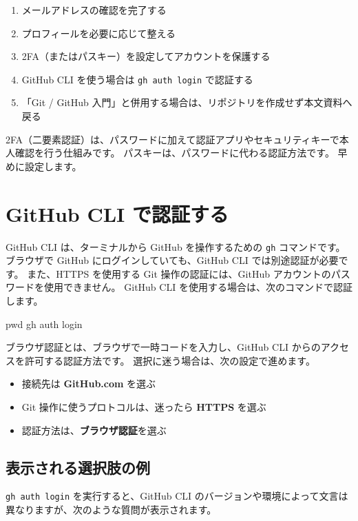 \documentclass[a4paper]{jlreq}
\newcommand{\cmd}[1]{\texttt{#1}}
\newcommand{\term}[1]{\textbf{#1}}
\begin{document}
\begin{enumerate}
  \item メールアドレスの確認を完了する
  \item プロフィールを必要に応じて整える
  \item 2FA（またはパスキー）を設定してアカウントを保護する
  \item GitHub CLI を使う場合は \cmd{gh auth login} で認証する
  \item 「Git / GitHub 入門」と併用する場合は、リポジトリを作成せず本文資料へ戻る
\end{enumerate}

2FA（二要素認証）は、パスワードに加えて認証アプリやセキュリティキーで本人確認を行う仕組みです\cite{github-account}。
パスキーは、パスワードに代わる認証方法です\cite{github-passkeys}。
早めに設定します。

\section{GitHub CLI で認証する}

GitHub CLI は、ターミナルから GitHub を操作するための \cmd{gh} コマンドです。
ブラウザで GitHub にログインしていても、GitHub CLI では別途認証が必要です。
また、HTTPS を使用する Git 操作の認証には、GitHub アカウントのパスワードを使用できません\cite{github-authentication}。
GitHub CLI を使用する場合は、次のコマンドで認証します\cite{gh-auth-login}。

\begin{codeblock}
pwd
gh auth login
\end{codeblock}

ブラウザ認証とは、ブラウザで一時コードを入力し、GitHub CLI からのアクセスを許可する認証方法です。
選択に迷う場合は、次の設定で進めます\cite{gh-auth-login}。

\begin{itemize}
  \item 接続先は \term{GitHub.com} を選ぶ
  \item Git 操作に使うプロトコルは、迷ったら \term{HTTPS} を選ぶ
  \item 認証方法は、\term{ブラウザ認証}を選ぶ
\end{itemize}

\subsection{表示される選択肢の例}

\cmd{gh auth login} を実行すると、GitHub CLI のバージョンや環境によって文言は異なりますが、次のような質問が表示されます。
\end{document}
